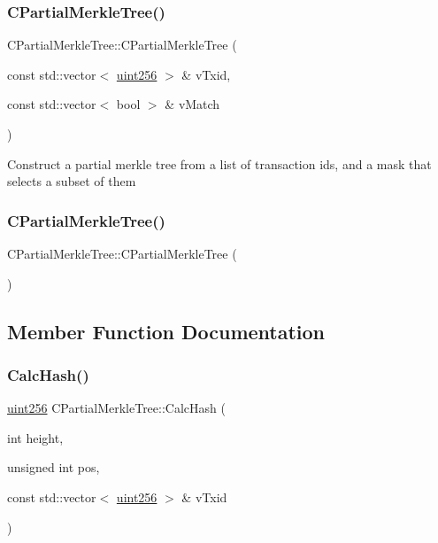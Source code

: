 \subsubsection{\texorpdfstring{C\+Partial\+Merkle\+Tree()}{CPartialMerkleTree()}\hspace{0.1cm}{\footnotesize\ttfamily [1/2]}}
{\footnotesize\ttfamily C\+Partial\+Merkle\+Tree\+::\+C\+Partial\+Merkle\+Tree (\begin{DoxyParamCaption}\item[{const std\+::vector$<$ \mbox{\hyperlink{classuint256}{uint256}} $>$ \&}]{v\+Txid,  }\item[{const std\+::vector$<$ bool $>$ \&}]{v\+Match }\end{DoxyParamCaption})}

Construct a partial merkle tree from a list of transaction ids, and a mask that selects a subset of them \mbox{\label{class_c_partial_merkle_tree_aad4948ace869c92614310846f9d9980d}} 
\subsubsection{\texorpdfstring{C\+Partial\+Merkle\+Tree()}{CPartialMerkleTree()}\hspace{0.1cm}{\footnotesize\ttfamily [2/2]}}
{\footnotesize\ttfamily C\+Partial\+Merkle\+Tree\+::\+C\+Partial\+Merkle\+Tree (\begin{DoxyParamCaption}{ }\end{DoxyParamCaption})}



\subsection{Member Function Documentation}
\mbox{\label{class_c_partial_merkle_tree_a69e7771f95c498f6a340dcc227abcde4}} 
\subsubsection{\texorpdfstring{Calc\+Hash()}{CalcHash()}}
{\footnotesize\ttfamily \mbox{\hyperlink{classuint256}{uint256}} C\+Partial\+Merkle\+Tree\+::\+Calc\+Hash (\begin{DoxyParamCaption}\item[{int}]{height,  }\item[{unsigned int}]{pos,  }\item[{const std\+::vector$<$ \mbox{\hyperlink{classuint256}{uint256}} $>$ \&}]{v\+Txid }\end{DoxyParamCaption})\hspace{0.3cm}{\ttfamily [protected]}}


